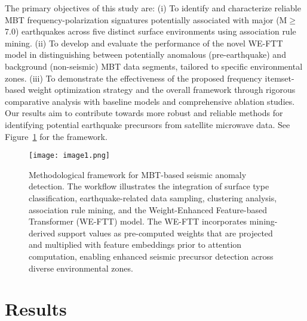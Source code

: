 \documentclass[fleqn,10pt]{wlscirep_mdpi_style}
\begin{document}
 
The primary objectives of this study are: (i) To identify and characterize reliable MBT frequency-polarization signatures potentially associated with major (M$\ge$7.0) earthquakes across five distinct surface environments using association rule mining. (ii) To develop and evaluate the performance of the novel WE-FTT model in distinguishing between potentially anomalous (pre-earthquake) and background (non-seismic) MBT data segments, tailored to specific environmental zones. (iii) To demonstrate the effectiveness of the proposed frequency itemset-based weight optimization strategy and the overall framework through rigorous comparative analysis with baseline models and comprehensive ablation studies. Our results aim to contribute towards more robust and reliable methods for identifying potential earthquake precursors from satellite microwave data. See Figure~\ref{fig:fig1} for the framework.

\begin{figure}[!htbp]
\centering
\texttt{[image: image1.png]} 
\caption{Methodological framework for MBT-based seismic anomaly detection. The workflow illustrates the integration of surface type classification, earthquake-related data sampling, clustering analysis, association rule mining, and the Weight-Enhanced Feature-based Transformer (WE-FTT) model. The WE-FTT incorporates mining-derived support values as pre-computed weights that are projected and multiplied with feature embeddings prior to attention computation, enabling enhanced seismic precursor detection across diverse environmental zones.}
\label{fig:fig1}
\end{figure}


 \FloatBarrier 
\section{Results}
\end{document}

